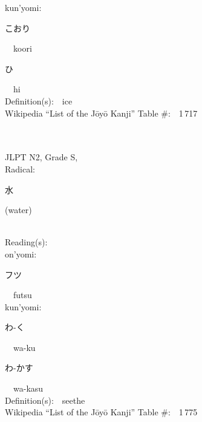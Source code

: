 \begin{multicols}{2}
{\hspace*{1em}}kun'yomi:\ \ \\
{\hspace*{2em}}{\begin{CJK}{UTF8}{min} こおり \end{CJK}}\ \ koori\ \ \\
{\hspace*{2em}}{\begin{CJK}{UTF8}{min} ひ \end{CJK}}\ \ hi\ \ \\
Definition(s):\ \ ice \\
Wikipedia ``List of the J\=oy\=o Kanji'' Table \#:\ \ 1\,717 \\
\ \ \\
{\fontsize{34pt}{40pt}  }\ \ \\  %
{JLPT N2, Grade S, \\Radical:\ \ {\begin{CJK}{UTF8}{min} 水 \end{CJK}} (water) } \\
Reading(s):\ \ \\
{\hspace*{1em}}on'yomi:\ \ \\
{\hspace*{2em}}{\begin{CJK}{UTF8}{min} フツ \end{CJK}}\ \ futsu\ \ \\
{\hspace*{1em}}kun'yomi:\ \ \\
{\hspace*{2em}}{\begin{CJK}{UTF8}{min} わ-く \end{CJK}}\ \ wa-ku\ \ \\
{\hspace*{2em}}{\begin{CJK}{UTF8}{min} わ-かす \end{CJK}}\ \ wa-kasu\ \ \\
Definition(s):\ \ seethe \\
Wikipedia ``List of the J\=oy\=o Kanji'' Table \#:\ \ 1\,775 \\
\ \ \\
{\fontsize{34pt}{40pt}  }\ \ \\  %

\end{multicols}
